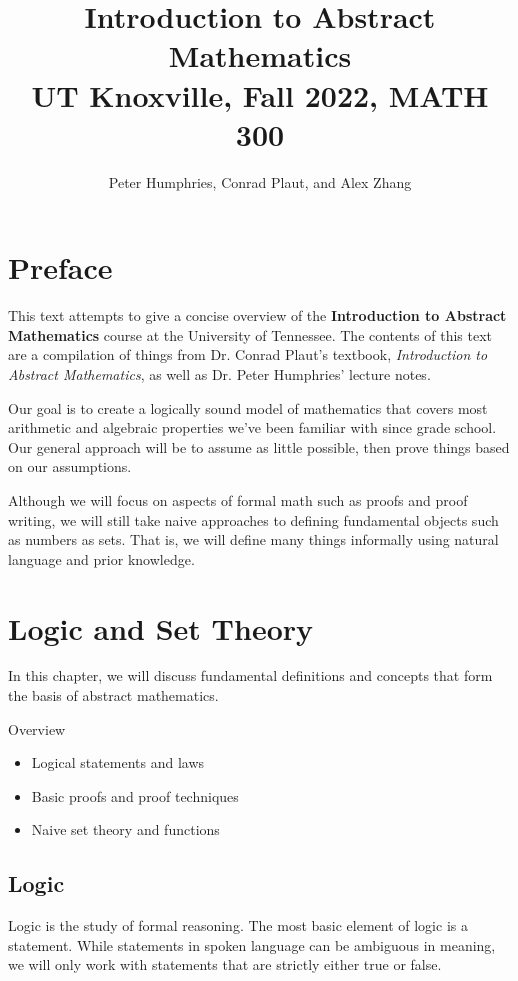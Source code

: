 \documentclass[letterpaper,12pt]{report}
\title{\textbf{Introduction to Abstract Mathematics}\\
\large UT Knoxville, Fall 2022, MATH 300}
\author{Peter Humphries, Conrad Plaut, and Alex Zhang}
\begin{document}
\renewcommand{\arraystretch}{1.25}

\maketitle
\tableofcontents

\chapter*{Preface}
This text attempts to give a concise overview of the \textbf{Introduction to Abstract Mathematics} course at the University of Tennessee. The contents of this text are a compilation of things from Dr. Conrad Plaut's textbook, \textit{Introduction to Abstract Mathematics}, as well as Dr. Peter Humphries' lecture notes.

Our goal is to create a logically sound model of mathematics that covers most arithmetic and algebraic properties we've been familiar with since grade school. Our general approach will be to assume as little possible, then prove things based on our assumptions.

Although we will focus on aspects of formal math such as proofs and proof writing, we will still take naive approaches to defining fundamental objects such as numbers as sets. That is, we will define many things informally using natural language and prior knowledge.
\chapter{Logic and Set Theory}
In this chapter, we will discuss fundamental definitions and concepts that form the basis of abstract mathematics.

\begin{genbox}{Overview}
	\begin{itemize}[noitemsep]
		\item Logical statements and laws
		\item Basic proofs and proof techniques
		\item Naive set theory and functions
	\end{itemize}
\end{genbox}

\section{Logic}
Logic is the study of formal reasoning. The most basic element of logic is a statement. While statements in spoken language can be ambiguous in meaning, we will only work with statements that are strictly either true or false.
\end{document}
